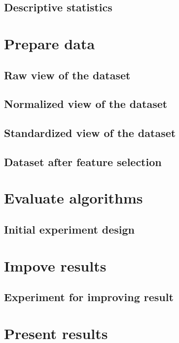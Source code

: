 \section{Descriptive statistics}

\chapter{Prepare data}
\section{Raw view of the dataset}
\section{Normalized view of the dataset}
\section{Standardized view of the dataset}
\section{Dataset after feature selection}

\chapter{Evaluate algorithms}
\section{Initial experiment design}

\chapter{Impove results}
\section{Experiment for improving result}

\chapter{Present results}